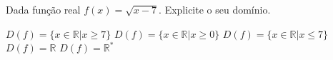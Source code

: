 Dada função real $f(x)=\sqrt{x-7}$. Explicite o seu domínio.

$D(f)=\{ x\in \mathbb{R} | x \geq 7 \}$
$D(f)=\{ x\in \mathbb{R} | x \geq 0 \}$
$D(f)=\{ x\in \mathbb{R} | x \leq 7 \}$
$D(f)=\mathbb{R}$
$D(f)=\mathbb{R}^*$





